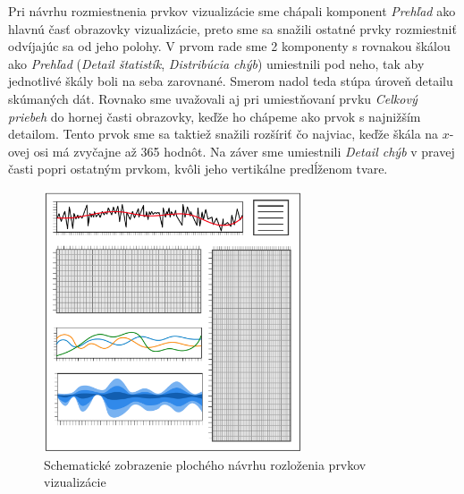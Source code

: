 Pri návrhu rozmiestnenia prvkov vizualizácie sme chápali komponent \textit{Prehľad} ako hlavnú časť obrazovky vizualizácie, preto sme sa snažili ostatné prvky rozmiestniť odvíjajúc sa od jeho polohy. V prvom rade sme 2 komponenty s rovnakou škálou ako \textit{Prehľad} (\textit{Detail štatistík}, \textit{Distribúcia chýb}) umiestnili pod neho, tak aby jednotlivé škály boli na seba zarovnané. Smerom nadol teda stúpa úroveň detailu skúmaných dát. Rovnako sme uvažovali aj pri umiestňovaní prvku \textit{Celkový priebeh} do hornej časti obrazovky, keďže ho chápeme ako prvok s najnižším detailom. Tento prvok sme sa taktiež snažili rozšíriť čo najviac, keďže škála na \mbox{$ x $-ovej} osi má zvyčajne až 365 hodnôt. Na záver sme umiestnili \textit{Detail chýb} v pravej časti popri ostatným prvkom, kvôli jeho vertikálne predĺženom tvare.

\begin{figure}
	\centering
	\includegraphics[width = 3.0in]{flatlayout}
	\caption{Schematické zobrazenie plochého návrhu rozloženia prvkov vizualizácie}
	\label{fig:flatlayout}
\end{figure}